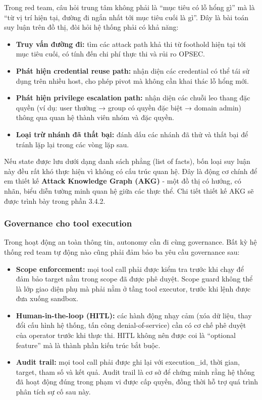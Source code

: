 Trong red team, câu hỏi trung tâm không phải là ``mục tiêu có lỗ hổng gì'' mà là ``từ vị trí hiện tại, đường đi ngắn nhất tới mục tiêu cuối là gì''. Đây là bài toán suy luận trên đồ thị, đòi hỏi hệ thống phải có khả năng:

\begin{itemize}
    \item \textbf{Truy vấn đường đi:} tìm các attack path khả thi từ foothold hiện tại tới mục tiêu cuối, có tính đến chi phí thực thi và rủi ro OPSEC.
    \item \textbf{Phát hiện credential reuse path:} nhận diện các credential có thể tái sử dụng trên nhiều host, cho phép pivot mà không cần khai thác lỗ hổng mới.
    \item \textbf{Phát hiện privilege escalation path:} nhận diện các chuỗi leo thang đặc quyền (ví dụ: user thường → group có quyền đặc biệt → domain admin) thông qua quan hệ thành viên nhóm và đặc quyền.
    \item \textbf{Loại trừ nhánh đã thất bại:} đánh dấu các nhánh đã thử và thất bại để tránh lặp lại trong các vòng lặp sau.
\end{itemize}

Nếu state được lưu dưới dạng danh sách phẳng (list of facts), bốn loại suy luận này đều rất khó thực hiện vì không có cấu trúc quan hệ. Đây là động cơ chính để em thiết kế \textbf{Attack Knowledge Graph (AKG)} - một đồ thị có hướng, có nhãn, biểu diễn tường minh quan hệ giữa các thực thể. Chi tiết thiết kế AKG sẽ được trình bày trong phần 3.4.2.

\subsubsection*{Governance cho tool execution}

Trong hoạt động an toàn thông tin, autonomy cần đi cùng governance. Bất kỳ hệ thống red team tự động nào cũng phải đảm bảo ba yêu cầu governance sau:

\begin{itemize}
    \item \textbf{Scope enforcement:} mọi tool call phải được kiểm tra trước khi chạy để đảm bảo target nằm trong scope đã được phê duyệt. Scope guard không thể là lớp giao diện phụ mà phải nằm ở tầng tool executor, trước khi lệnh được đưa xuống sandbox.
    \item \textbf{Human-in-the-loop (HITL):} các hành động nhạy cảm (xóa dữ liệu, thay đổi cấu hình hệ thống, tấn công denial-of-service) cần có cơ chế phê duyệt của operator trước khi thực thi. HITL không nên được coi là ``optional feature'' mà là thành phần kiến trúc bắt buộc.
    \item \textbf{Audit trail:} mọi tool call phải được ghi lại với execution\_id, thời gian, target, tham số và kết quả. Audit trail là cơ sở để chứng minh rằng hệ thống đã hoạt động đúng trong phạm vi được cấp quyền, đồng thời hỗ trợ quá trình phân tích sự cố sau này.
\end{itemize}

